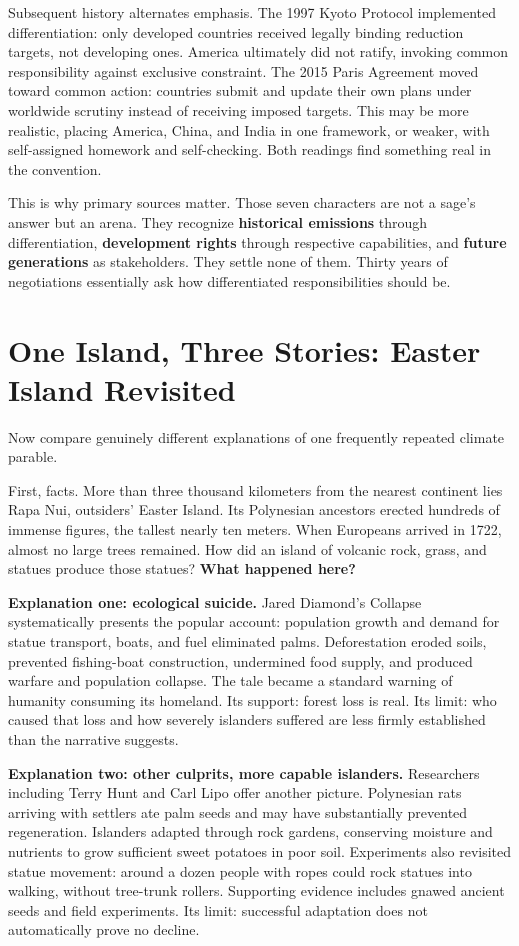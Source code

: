 Subsequent history alternates emphasis. The 1997 Kyoto Protocol implemented differentiation: only developed countries received legally binding reduction targets, not developing ones. America ultimately did not ratify, invoking common responsibility against exclusive constraint. The 2015 Paris Agreement moved toward common action: countries submit and update their own plans under worldwide scrutiny instead of receiving imposed targets. This may be more realistic, placing America, China, and India in one framework, or weaker, with self-assigned homework and self-checking. Both readings find something real in the convention.

This is why primary sources matter. Those seven characters are not a sage's answer but an arena. They recognize \textbf{historical emissions} through differentiation, \textbf{development rights} through respective capabilities, and \textbf{future generations} as stakeholders. They settle none of them. Thirty years of negotiations essentially ask how differentiated responsibilities should be.

\section[Easter Island: Three Stories]{One Island, Three Stories: Easter Island Revisited}
Now compare genuinely different explanations of one frequently repeated climate parable.

First, facts. More than three thousand kilometers from the nearest continent lies Rapa Nui, outsiders' Easter Island. Its Polynesian ancestors erected hundreds of immense figures, the tallest nearly ten meters. When Europeans arrived in 1722, almost no large trees remained. How did an island of volcanic rock, grass, and statues produce those statues? \textbf{What happened here?}

\textbf{Explanation one: ecological suicide.} Jared Diamond's Collapse systematically presents the popular account: population growth and demand for statue transport, boats, and fuel eliminated palms. Deforestation eroded soils, prevented fishing-boat construction, undermined food supply, and produced warfare and population collapse. The tale became a standard warning of humanity consuming its homeland. Its support: forest loss is real. Its limit: who caused that loss and how severely islanders suffered are less firmly established than the narrative suggests.

\textbf{Explanation two: other culprits, more capable islanders.} Researchers including Terry Hunt and Carl Lipo offer another picture. Polynesian rats arriving with settlers ate palm seeds and may have substantially prevented regeneration. Islanders adapted through rock gardens, conserving moisture and nutrients to grow sufficient sweet potatoes in poor soil. Experiments also revisited statue movement: around a dozen people with ropes could rock statues into walking, without tree-trunk rollers. Supporting evidence includes gnawed ancient seeds and field experiments. Its limit: successful adaptation does not automatically prove no decline.

